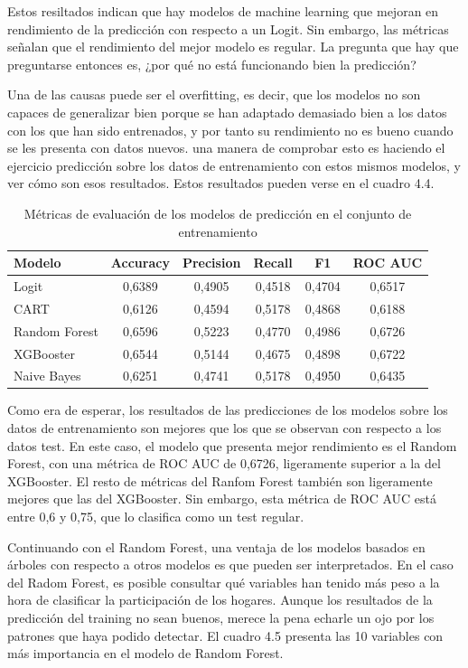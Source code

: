 Estos resiltados indican que hay modelos de machine learning que mejoran en rendimiento de la predicción con respecto a un Logit. Sin embargo, las métricas señalan que el rendimiento del mejor modelo es regular. La pregunta que hay que preguntarse entonces es, ¿por qué no está funcionando bien la predicción?

Una de las causas puede ser el overfitting, es decir, que los modelos no son capaces de generalizar bien porque se han adaptado demasiado bien a los datos con los que han sido entrenados, y por tanto su rendimiento no es bueno cuando se les presenta con datos nuevos. una manera de comprobar esto es haciendo el ejercicio predicción sobre los datos de entrenamiento con estos mismos modelos, y ver cómo son esos resultados. Estos resultados pueden verse en el cuadro 4.4.

\begin{table}[ht]
    \centering
    \begin{tabular}{lccccc}
    \hline
        \textbf{Modelo} & \textbf{Accuracy} & \textbf{Precision} & \textbf{Recall} & \textbf{F1} & \textbf{ROC AUC} \\ \hline
        Logit & 0,6389 & 0,4905 & 0,4518 & 0,4704 & 0,6517 \\ 
        CART & 0,6126 & 0,4594 & 0,5178 & 0,4868 & 0,6188 \\ 
        Random Forest & 0,6596 & 0,5223 & 0,4770 & 0,4986 & 0,6726 \\ 
        XGBooster & 0,6544 & 0,5144 & 0,4675 & 0,4898 & 0,6722 \\ 
        Naive Bayes & 0,6251 & 0,4741 & 0,5178 & 0,4950 & 0,6435 \\ \hline
    \end{tabular}
    \caption{Métricas de evaluación de los modelos de predicción en el conjunto de entrenamiento}
\end{table}

Como era de esperar, los resultados de las predicciones de los modelos sobre los datos de entrenamiento son mejores que los que se observan con respecto a los datos test. En este caso, el modelo que presenta mejor rendimiento es el Random Forest, con una métrica de ROC AUC de 0,6726, ligeramente superior a la del XGBooster. El resto de métricas del Ranfom Forest también son ligeramente mejores que las del XGBooster. Sin embargo, esta métrica de ROC AUC está entre 0,6 y 0,75, que lo clasifica como un test regular.

Continuando con el Random Forest, una ventaja de los modelos basados en árboles con respecto a otros modelos es que pueden ser interpretados. En el caso del Radom Forest, es posible consultar qué variables han tenido más peso a la hora de clasificar la participación de los hogares. Aunque los resultados de la predicción del training no sean buenos, merece la pena echarle un ojo por los patrones que haya podido detectar. El cuadro 4.5 presenta las 10 variables con más importancia en el modelo de Random Forest.

